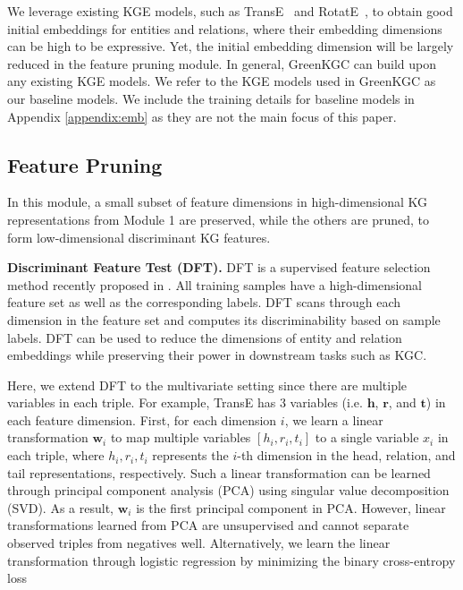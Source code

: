 \documentclass{article}
\begin{document}
We leverage existing KGE models, such as TransE~\citep{bordes2013translating} 
and RotatE~\citep{sun2018rotate}, to obtain good initial embeddings for entities
and relations, where their embedding dimensions can be high to be
expressive. Yet, the initial embedding dimension will be largely reduced
in the feature pruning module. In general, GreenKGC can build upon any
existing KGE models. We refer to the KGE models used in GreenKGC as our 
baseline models.
We include the training details for baseline models 
in Appendix \ref{appendix:emb} as they are not the main focus of this paper.



\subsection{Feature Pruning}\label{subsec:feature}

In this module, a small subset of feature dimensions in high-dimensional
KG representations from Module 1 are preserved, while the others are pruned,
to form low-dimensional discriminant KG features.

\textbf{Discriminant Feature Test (DFT).} DFT is a supervised feature
selection method recently proposed in \citet{yang2022supervised}.  All
training samples have a high-dimensional feature set as well as the
corresponding labels. DFT scans through each dimension in the feature
set and computes its discriminability based on sample labels.  DFT can
be used to reduce the dimensions of entity and relation embeddings while
preserving their power in downstream tasks such as KGC. 

Here, we extend DFT to the multivariate setting since there are
multiple variables in each triple. For example, TransE 
\citep{bordes2013translating} has 3 variables (i.e. $\bm{h}$, $\bm{r}$, and $\bm{t}$) in 
each feature dimension. 
First, for each dimension $i$, we learn a linear transformation $\bm{w}_i$ to map 
multiple variables $[h_i, r_i, t_i]$ to a 
single variable $x_i$ in each triple, where $h_i, r_i, t_i$ represents the 
$i$-th dimension in the head, relation, and tail representations, respectively. Such a linear 
transformation can be 
learned through principal component analysis (PCA) using singular value 
decomposition (SVD). As a result, $\bm{w}_i$ is the first principal component in PCA.
However, linear transformations learned from PCA are unsupervised and cannot 
separate observed triples from negatives well. Alternatively, we learn the linear 
transformation through logistic regression by minimizing the binary cross-entropy loss
\end{document}
